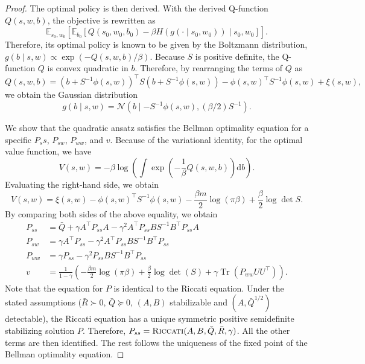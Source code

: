 \documentclass[letterpaper]{article} %
\DeclareMathOperator{\Tr}{Tr}     %
\providecommand{\E}{\mathbb{E}} %
\providecommand{\rmd}{\mathrm{d}} %
\begin{document}
\begin{proof}
    The optimal policy is then derived. With the derived Q-function $Q(s, w, b)$, the objective is rewritten as
    \begin{equation}
    \E_{s_0,w_0}\left[  \E_{b_0} \left[ Q(s_0, w_0, b_0) - \beta H(g(\cdot \mid s_0, w_0)) \mid s_0, w_0\right] \right].
    \end{equation}
    Therefore, its optimal policy is known to be given by the Boltzmann distribution, $g(b \mid s, w) \propto \exp( - Q(s, w, b) / \beta)$. Because $S$ is positive definite, the Q-function $Q$ is convex quadratic in $b$. Therefore, by rearranging the terms of $Q$ as
    \begin{equation}
    Q(s, w, b) = (b + S^{-1} \phi(s, w))^\top S (b + S^{-1} \phi(s, w)) - \phi(s, w)^\top S^{-1} \phi(s, w) + \xi(s, w),
    \end{equation}
    we obtain the Gaussian distribution
    \begin{equation}
    g(b \mid s, w) = \mathcal{N}(b \mid - S^{-1} \phi(s, w), (\beta / 2) S^{-1}).
    \end{equation}
    
    We show that the quadratic ansatz satisfies the Bellman optimality equation for a specific $P_ss$, $P_{sw}$, $P_{ww}$, and $v$. 
    Because of the variational identity, for the optimal value function, we have
    \begin{equation}
    V(s, w) = - \beta \log \left( \int \exp \left( - \frac{1}{\beta} Q(s, w, b) \right) \rmd b\right) .
    \end{equation}
    Evaluating the right-hand side, we obtain 
    \begin{equation}
    V(s, w) = \xi(s, w) - \phi(s, w)^\top S^{-1} \phi(s, w) - \frac{\beta m}{2} \log(\pi \beta) + \frac{\beta}{2} \log \det S . 
    \end{equation}
    By comparing both sides of the above equality, we obtain
    \begin{align}
    P_{ss} &= \bar{Q} + \gamma A^\top P_{ss} A - \gamma^2 A^\top P_{ss} B S^{-1} B^\top P_{ss} A\\
    P_{sw} &= \gamma A^\top P_{ss} - \gamma^2 A^\top P_{ss} B S^{-1} B^\top P_{ss}\\
    P_{ww} &= \gamma P_{ss} - \gamma^2 P_{ss} B S^{-1} B^\top P_{ss}\\
    v &= \frac{1}{1 - \gamma} \left( - \frac{\beta m}{2} \log(\pi \beta) +  \frac{\beta}{2} \log \det(S) + \gamma \Tr(P_{ww} UU^\top) \right).
    \end{align}
    Note that the equation for $P$ is identical to the Riccati equation. Under the stated assumptions ($\bar{R} \succ 0$, $\bar{Q} \succcurlyeq 0$, $(A, B)$ stabilizable and $(A, \bar{Q}^{1/2})$ detectable), the Riccati equation has a unique symmetric positive semidefinite stabilizing solution $P$. Therefore, $P_{ss} = \text{\textsc{Riccati}}(A, B, \bar{Q}, \bar{R}, \gamma)$. All the other terms are then identified. The rest follows the uniqueness of the fixed point of the Bellman optimality equation. 
\end{proof}
\end{document}
